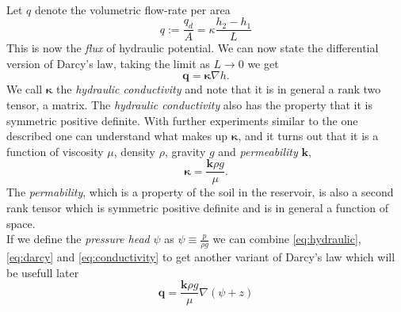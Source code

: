 \documentclass[../Main/main.tex]{subfiles}
\begin{document}
\\
Let $q$ denote the volumetric flow-rate per area
\begin{equation*}
q := \frac{q_d}{A} = \kappa \frac{h_2-h_1}{L}
\end{equation*}
This is now the \emph{flux} of hydraulic potential. We can now state the differential version of Darcy's law, taking the limit as $L\rightarrow 0$ we get 
\begin{equation}\label{eq:darcy}
\bm{q} = \bm{\kappa} \nabla h.
\end{equation}
We call $\bm{\kappa}$ the \emph{hydraulic conductivity} and note that it is in general a rank two tensor, a matrix. The \emph{hydraulic conductivity} also has the property that it is symmetric positive definite. 
With further experiments similar to the one described one can understand what makes up $\bm{\kappa}$, and it turns out that it is  a function of viscosity $\mu$, density $\rho$, gravity $g$ and \emph{permeability} $\bm{k}$,
\begin{equation} \label{eq:conductivity}
\bm{\kappa} = \frac{\bm{k} \rho g}{\mu}.
\end{equation}
The \emph{permability}, which is a property of the soil in the reservoir, is also a second rank tensor which is symmetric positive definite and is in general a function of space. \\
If we define the \emph{pressure head} $\psi$ as $\psi \equiv \frac{p}{\rho g}$ we can combine \eqref{eq:hydraulic}, \eqref{eq:darcy} and \eqref{eq:conductivity} to get another variant of Darcy's law which will be usefull later
\begin{equation}\label{eq:darcyv2}
\bm{q} = \frac{\bm{k}\rho g}{\mu}\nabla(\psi + z)
\end{equation}
\end{document}
